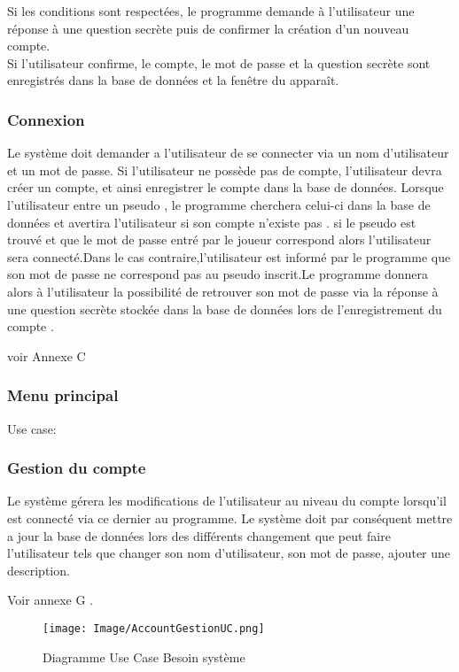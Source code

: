 \documentclass[french, utf8]{article}
\begin{document}
Si les conditions sont respectées, le programme
demande à l'utilisateur une réponse à une question secrète puis de confirmer la création d'un
nouveau compte.
\\Si l'utilisateur confirme, le compte, le mot de passe et la question secrète sont enregistrés dans
la base de données et la fenêtre du
 apparaît.

\subsubsection{Connexion}
\label{sec:Connexion}
Le système doit demander a l'utilisateur de  se connecter via un nom d'utilisateur et un mot de passe. Si l'utilisateur ne possède pas de compte, l'utilisateur devra créer un compte, et ainsi enregistrer le compte dans la base de données. Lorsque l'utilisateur entre un pseudo , le programme cherchera celui-ci  dans la base de données et avertira l'utilisateur si son compte n'existe pas . si le pseudo est trouvé et que le mot de passe entré par le joueur correspond alors l'utilisateur sera connecté.Dans le cas contraire,l'utilisateur est informé par le programme que son mot de passe ne correspond pas au pseudo inscrit.Le programme donnera alors à l'utilisateur la possibilité de retrouver son mot de passe via la réponse à une question secrète stockée dans la base de données lors de l'enregistrement du compte .

voir Annexe C 

\subsubsection{Menu principal}
\label{sec:MenuPrincipalSystem}

Use case: 

\subsubsection{Gestion du compte}
\label{sec:GestionDeCompte}
Le système gérera les modifications de l'utilisateur au niveau du compte lorsqu'il est connecté via ce dernier au programme. Le système doit par conséquent mettre a jour la base de données lors des différents changement que peut faire l'utilisateur tels que changer son nom d'utilisateur, son mot de passe, ajouter une description.

Voir annexe G .
\begin{figure}[ht]
     \centering
    \texttt{[image: Image/AccountGestionUC.png]}
   \caption{Diagramme Use Case Besoin système}
\end{figure}
\end{document}
